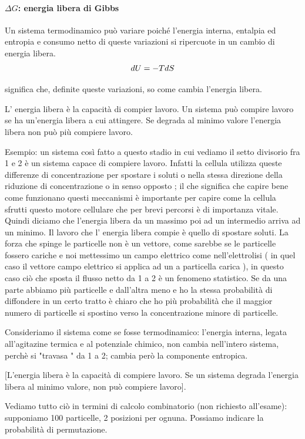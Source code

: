 \documentclass[a4paper,12pt]{article}
\begin{document}
\paragraph{$\Delta G$: energia libera di Gibbs}
Un sistema termodinamico può variare poiché l'energia interna, entalpia ed entropia e consumo netto di queste variazioni si ripercuote in un cambio di energia libera.
\begin{equation}
\centering
dU=-TdS 
\end{equation}

significa che, definite queste variazioni, so come cambia l'energia libera.

L' energia libera è la capacità di compier lavoro.
Un sistema può compire lavoro se ha un'energia libera a cui attingere. Se degrada al minimo valore l'energia libera non può più compiere lavoro.

Esempio: un sistema così fatto a questo stadio in cui vediamo il setto divisorio fra 1 e 2 è un sistema capace di compiere lavoro.
Infatti la cellula utilizza queste differenze di concentrazione per spostare i soluti o nella stessa direzione della riduzione di concentrazione o in senso opposto ; il che significa che capire bene come funzionano questi meccanismi è importante per capire come la cellula sfrutti questo motore cellulare che per brevi percorsi è di importanza vitale.
Quindi diciamo che l'energia libera da un massimo poi ad un intermedio arriva ad un minimo. Il lavoro che l' energia libera compie è quello di spostare soluti.
La forza che spinge le particelle non è un vettore, come sarebbe se le particelle fossero cariche e noi mettessimo un campo elettrico come nell'elettrolisi ( in quel caso il vettore campo elettrico si applica ad un a particella carica ), in questo caso ciò che sposta il flusso netto da 1 a 2 è un fenomeno statistico.
Se da una parte abbiamo più particelle e dall’altra meno e ho la stessa probabilità di diffondere in un certo tratto è chiaro che ho più probabilità che il maggior numero di particelle si spostino verso la concentrazione minore di particelle.

Consideriamo il sistema come se fosse termodinamico:
l'energia interna, legata all'agitazine termica e al potenziale chimico, non cambia nell'intero sistema, perchè si "travasa " da 1 a 2; cambia però la componente entropica.

[L'energia libera è la capacità di compiere lavoro. Se un sistema degrada l'energia libera al minimo valore, non può compiere lavoro]. 

Vediamo tutto ciò in termini di calcolo combinatorio (non richiesto all'esame):
supponiamo 100 particelle, 2 posizioni per ognuna. Possiamo indicare la probabilità di permutazione.
\end{document}
